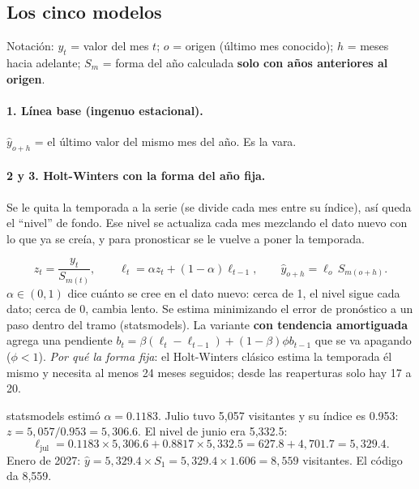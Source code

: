 \subsection{Los cinco modelos}
Notación: $y_t$ = valor del mes $t$; $o$ = origen (último mes conocido); $h$ = meses hacia adelante; $S_m$ = forma del año
calculada \textbf{solo con años anteriores al origen}.

\paragraph{1. Línea base (ingenuo estacional).} $\hat y_{o+h}$ = el último valor del mismo mes del año. Es la vara.

\paragraph{2 y 3. Holt-Winters con la forma del año fija.}
\begin{intuicion}
Se le quita la temporada a la serie (se divide cada mes entre su índice), así queda el ``nivel'' de fondo. Ese nivel se
actualiza cada mes mezclando el dato nuevo con lo que ya se creía, y para pronosticar se le vuelve a poner la temporada.
\end{intuicion}
\[
z_t=\frac{y_t}{S_{m(t)}},\qquad \ell_t=\alpha z_t+(1-\alpha)\ell_{t-1},\qquad \hat y_{o+h}=\ell_o\,S_{m(o+h)} .
\]
$\alpha\in(0,1)$ dice cuánto se cree en el dato nuevo: cerca de 1, el nivel sigue cada dato; cerca de 0, cambia lento. Se
estima minimizando el error de pronóstico a un paso dentro del tramo (statsmodels). La variante \textbf{con tendencia
amortiguada} agrega una pendiente $b_t=\beta(\ell_t-\ell_{t-1})+(1-\beta)\phi b_{t-1}$ que se va apagando ($\phi<1$).
\emph{Por qué la forma fija}: el Holt-Winters clásico estima la temporada él mismo y necesita al menos 24 meses seguidos;
desde las reaperturas solo hay 17 a 20.

\begin{amano}
statsmodels estimó $\alpha=0.1183$. Julio tuvo 5,057 visitantes y su índice es 0.953: $z=5{,}057/0.953=5{,}306.6$. El
nivel de junio era 5,332.5:
\[
\ell_{\text{jul}}=0.1183\times5{,}306.6+0.8817\times5{,}332.5=627.8+4{,}701.7=5{,}329.4 .
\]
Enero de 2027: $\hat y=5{,}329.4\times S_1=5{,}329.4\times1.606=8{,}559$ visitantes. El código da 8,559.
\end{amano}

